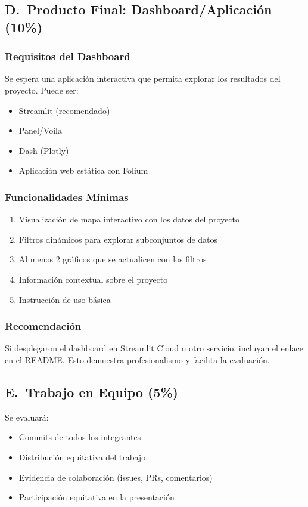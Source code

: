 \documentclass[11pt,a4paper]{article}
\begin{document}
\subsection{D.\ Producto Final: Dashboard/Aplicación (10\%)}
\subsubsection*{Requisitos del Dashboard}
Se espera una aplicación interactiva que permita explorar los resultados del proyecto. Puede
ser:
\begin{itemize}[leftmargin=*]
\item Streamlit (recomendado)
\item Panel/Voila
\item Dash (Plotly)
\item Aplicación web estática con Folium
\end{itemize}

\subsubsection{Funcionalidades Mínimas}
\begin{enumerate}[leftmargin=*]
\item Visualización de mapa interactivo con los datos del proyecto
\item Filtros dinámicos para explorar subconjuntos de datos
\item Al menos 2 gráficos que se actualicen con los filtros
\item Información contextual sobre el proyecto
\item Instrucción de uso básica
\end{enumerate}

\subsubsection*{Recomendación}
Si desplegaron el dashboard en Streamlit Cloud u otro servicio, incluyan el enlace en el
README. Esto demuestra profesionalismo y facilita la evaluación.

\subsection{E.\ Trabajo en Equipo (5\%)}
Se evaluará:
\begin{itemize}[leftmargin=*]
\item Commits de todos los integrantes
\item Distribución equitativa del trabajo
\item Evidencia de colaboración (issues, PRs, comentarios)
\item Participación equitativa en la presentación
\end{itemize}
\end{document}
